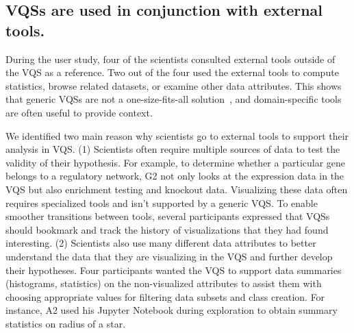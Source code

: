 \subsection{VQSs are used in conjunction with external tools.}
\par During the user study, four of the scientists consulted external tools outside of the VQS as a reference. Two out of the four used the external tools to compute statistics, browse related datasets, or examine other data attributes. This shows that generic VQSs are not a one-size-fits-all solution~\cite{stonebraker2005one}, and domain-specific tools are often useful to provide context.
\par We identified two main reason why scientists go to external tools to support their analysis in VQS. (1) Scientists often require multiple sources of data to test the validity of their hypothesis. For example, to determine whether a particular gene belongs to a regulatory network, G2 not only looks at the expression data in the VQS but also enrichment testing and knockout data. Visualizing these data often requires specialized tools and isn't  supported by a generic VQS. To enable smoother transitions between tools, several participants expressed that VQSs should bookmark and track the history of visualizations that they had found interesting. (2) Scientists also use many different data attributes to better understand the data that they are visualizing in the VQS and further develop their hypotheses. Four participants wanted the VQS to support data summaries (histograms, statistics) on the non-visualized attributes to assist them with choosing appropriate values for filtering data subsets and class creation. For instance, A2 used his Jupyter Notebook during  exploration to obtain summary statistics on radius of a star. 

